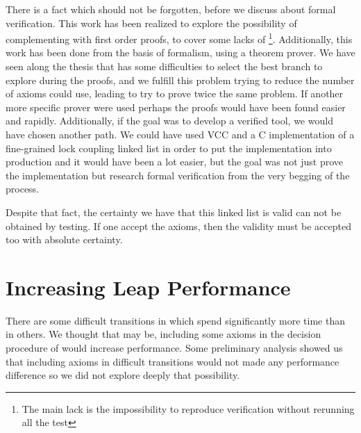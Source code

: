 There is a fact which should not be forgotten, before we discuss about formal verification. 
%
This work has been realized to explore the possibility of complementing \leap\xspace with first order proofs, to cover some lacks of \leap
\footnote{The main lack is the impossibility to reproduce verification without rerunning all the test}.
%
Additionally, this work has been done from the basis of formalism, using a theorem prover. 
%
We have seen along the thesis that \spass has some difficulties to select the best branch to explore during the proofs, and we fulfill this problem trying to reduce the number of axioms \spass could use, leading to try to prove twice the same problem. 
%
If another more specific prover were used perhaps the proofs would have been found easier and rapidly.
%
Additionally, if the goal was to develop a verified tool, we would have chosen another path. 
%
We could have used \gls{VCC} and a C implementation of a fine-grained lock coupling linked list in order to put the implementation into production and it would have been a lot easier, but the goal was not just prove the implementation but research formal verification from the very begging of the process.


Despite that fact, the certainty we have that this linked list is valid can not be obtained by testing. 
%
If one accept the axioms, then the validity must be accepted too with absolute certainty.


\section{Increasing Leap Performance}

There are some difficult transitions in which \leap spend significantly more time than in others.
%
We thought that may be, including some axioms in the decision procedure of \leap would increase \leap performance. 
%
Some preliminary analysis showed us that including axioms in difficult transitions would not made any performance difference so we did not explore deeply that possibility.
